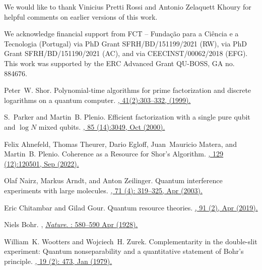 \documentclass[letterpaper,onecolumn,12pt,accepted=2024-01-17]{article}
\begin{document}
We would like to thank Vinicius Pretti Rossi and Antonio Zelaquett Khoury for helpful comments on earlier versions of this work.

We acknowledge financial support from FCT -- Fundação para a Ciência e a Tecnologia (Portugal) via PhD Grant SFRH/BD/151199/2021 (RW), via PhD Grant SFRH/BD/151190/2021 (AC), and via CEECINST/00062/2018 (EFG). This work was supported by the ERC Advanced Grant QU-BOSS, GA no. 884676.




\begin{thebibliography}{100}



Peter~W. Shor.
\newblock Polynomial-time algorithms for prime factorization and discrete
  logarithms on a quantum computer.
\href{https://doi.org/10.1137/S0036144598347011}{, 41(2):303--332, (1999).}

S.~Parker and Martin~B. Plenio.
\newblock Efficient factorization with a single pure qubit and $\log N$ mixed
  qubits.
\href{https://doi.org/10.1103/PhysRevLett.85.3049}{, 85 (14):3049, Oct (2000).}

Felix Ahnefeld, Thomas Theurer, Dario Egloff, Juan~Mauricio Matera, and
  Martin~B. Plenio.
\newblock Coherence as a {R}esource for {S}hor's {A}lgorithm.
\href{https://doi.org/10.1103/PhysRevLett.129.120501}{, 129 (12):120501, Sep (2022).}

Olaf Nairz, Markus Arndt, and Anton Zeilinger.
\newblock Quantum interference experiments with large molecules.
\href{https://doi.org/10.1119/1.1531580}{, 71 (4): 319--325, Apr (2003).}

Eric Chitambar and Gilad Gour.
\newblock Quantum resource theories.
\href{https://doi.org/10.1103/RevModPhys.91.025001}{, 91 (2), Apr (2019).}

Niels Bohr.
, \href{https://doi.org/10.1038/121580a0}{\emph{Nature}.
: 580--590 Apr (1928).}

William~K. Wootters and Wojciech~H. Zurek.
\newblock Complementarity in the double-slit experiment: Quantum
  nonseparability and a quantitative statement of {B}ohr's principle.
\href{https://doi.org/10.1103/PhysRevD.19.473}{, 19 (2): 473, Jan (1979).}


\end{thebibliography}
\end{document}
